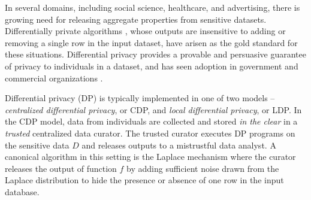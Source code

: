 
In several domains, including social science, healthcare, and advertising, there is growing need for releasing aggregate properties from sensitive datasets. Differentially private algorithms \cite{dwork}, whose outputs are insensitive to adding or removing a single row in the input dataset, have arisen as the gold standard for these situations. Differential privacy provides a provable and persuasive guarantee of privacy to individuals in a dataset, and has seen adoption in government \cite{machanavajjhala08onthemap,Vilhuber17Proceedings} and commercial organizations \cite{Erlingsson14Rappor,Greenberg16Apples}. 

Differential privacy (DP) is typically implemented in one of two models -- \textit{centralized differential privacy}, or CDP, and \textit{local differential privacy}, or LDP. In the CDP model, data from individuals are collected and stored \textit{in the clear} in a \textit{trusted} centralized data curator. The trusted curator executes DP programs on the sensitive data $D$ and releases outputs to a mistrustful data analyst. A canonical algorithm in this setting is the Laplace mechanism where the curator releases the output of function $f$ by adding sufficient noise drawn from the Laplace distribution to hide the presence or absence of one row in the input database. 

